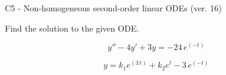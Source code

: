 \begin{exercise}
  \begin{exerciseTitle}C5 - Non-homogeneous second-order linear ODEs (ver. 16)\end{exerciseTitle}
  \begin{exerciseStatement}
    
Find the solution to the given ODE.

    
\[y''-4y'+3y = -24 \, e^{\left(-t\right)}\]

  \end{exerciseStatement}
  \begin{exerciseAnswer}
    
\[y= k_{1} e^{\left(3 \, t\right)} + k_{2} e^{t} - 3 \, e^{\left(-t\right)}\]

  \end{exerciseAnswer}
\end{exercise}